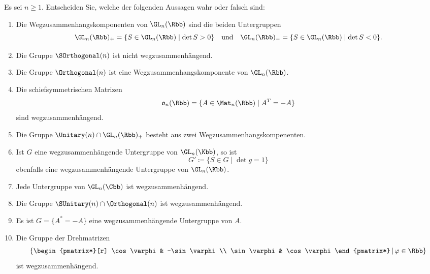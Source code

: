 \begin{question}
  Es sei $n \geq 1$.
  Entscheiden Sie, welche der folgenden Aussagen wahr oder falsch sind:
  \begin{enumerate}[leftmargin=*]
    \item
      Die Wegzusammenhangskomponenten von $\GL_n(\Rbb)$ sind die beiden Untergruppen
      \[
        \GL_n(\Rbb)_+ = \{ S \in \GL_n(\Rbb) \mid \det S > 0 \}
        \quad\text{und}\quad
        \GL_n(\Rbb)_- = \{ S \in \GL_n(\Rbb) \mid \det S < 0 \}.
      \]
    \item
      Die Gruppe $\SOrthogonal(n)$ ist nicht wegzusammenhängend.
    \item
      Die Gruppe $\Orthogonal(n)$ ist eine Wegzusammenhangskomponente von $\GL_n(\Rbb)$.
    \item
      Die schiefsymmetrischen Matrizen
      \[
        \mathfrak{o}_n(\Rbb) = \{ A \in \Mat_n(\Rbb) \mid A^T = -A \}
      \]
      sind wegzusammenhängend.
    \item
      Die Gruppe $\Unitary(n) \cap \GL_n(\Rbb)_+$ besteht aus zwei Wegzusammenhangskompenenten.
    \item
      Ist $G$ eine wegzusammenhängende Untergruppe von $\GL_n(\Kbb)$, so ist
      \[
        G' \coloneqq \{ S \in G \mid \det g = 1 \}
      \]
      ebenfalls eine wegzusammenhängende Untergruppe von $\GL_n(\Kbb)$.
    \item
      Jede Untergruppe von $\GL_n(\Cbb)$ ist wegzusammenhängend.
    \item
      Die Gruppe $\SUnitary(n) \cap \Orthogonal(n)$ ist wegzusammenhängend.
    \item
      Es ist $G = \{A^* = - A\}$ eine wegzusammenhängende Untergruppe von $A$.
    \item
      Die Gruppe der Drehmatrizen
      \[
        \left\{
          \begin{pmatrix*}[r]
            \cos \varphi  & -\sin \varphi \\
            \sin \varphi  &  \cos \varphi 
          \end{pmatrix*}
        \,\middle|\,
        \varphi \in \Rbb
        \right\}
      \]
      ist wegzusammenhängend.
  \end{enumerate}
\end{question}

